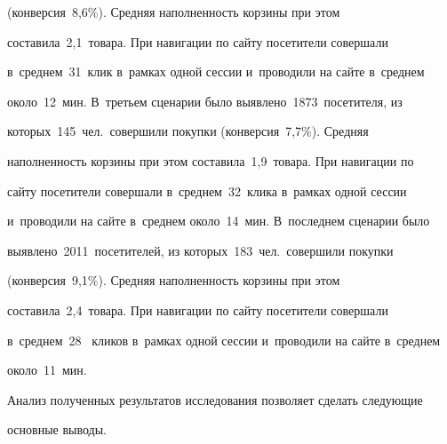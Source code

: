 (конверсия~8,6\%). Средняя наполненность корзины при этом 


составила~2,1~товара. При навигации по сайту посетители совершали 


в~среднем~31~клик в~рамках одной сессии и~проводили на сайте в~среднем 


около~12~мин. В~третьем сценарии было выявлено~1873~посетителя, из 


ко\-то\-рых~145~чел.\ совершили покупки (конверсия~7,7\%). Средняя 


наполненность корзины при этом составила~1,9~товара. При навигации по 


сайту посетители совершали в~среднем~32~клика в~рамках одной сессии 


и~проводили на сайте в~среднем около~14~мин. В~последнем сценарии было 


выявлено~2011~посетителей, из которых~183~чел.\ совершили покупки 


(конверсия~9,1\%). Средняя наполненность корзины при этом 


составила~2,4~товара. При навигации по сайту посетители совершали 


в~среднем~28~ кликов в~рамках одной сессии и~проводили на сайте в~среднем 


около~11~мин. 


  


  Анализ полученных результатов исследования позволяет сделать следующие 


основные выводы.


